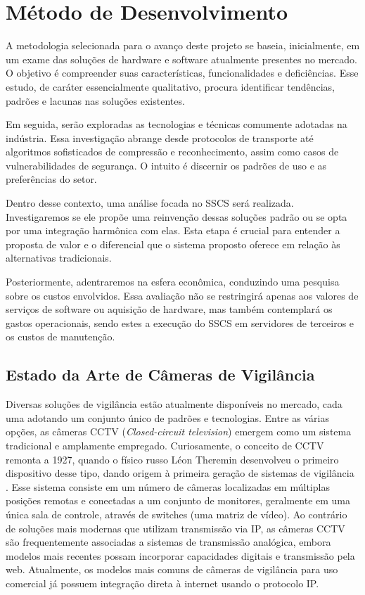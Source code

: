 \documentclass[12pt, %
openright, 
oneside, %
a4paper,    %
brazil]{facom-ufu-abntex2}
\begin{document}
\chapter{Método de Desenvolvimento}

A metodologia selecionada para o avanço deste projeto se baseia, inicialmente,
em um exame das soluções de hardware e software atualmente presentes no
mercado. O objetivo é compreender suas características, funcionalidades e
deficiências. Esse estudo, de caráter essencialmente qualitativo, procura
identificar tendências, padrões e lacunas nas soluções existentes.

Em seguida, serão exploradas as tecnologias e técnicas comumente adotadas na
indústria. Essa investigação abrange desde protocolos de transporte até
algoritmos sofisticados de compressão e reconhecimento, assim como casos de
vulnerabilidades de segurança. O intuito é discernir os padrões de uso e as
preferências do setor.

Dentro desse contexto, uma análise focada no SSCS será realizada.
Investigaremos se ele propõe uma reinvenção dessas soluções padrão ou se opta
por uma integração harmônica com elas. Esta etapa é crucial para entender a
proposta de valor e o diferencial que o sistema proposto oferece em relação às
alternativas tradicionais.

Posteriormente, adentraremos na esfera econômica, conduzindo uma pesquisa sobre
os custos envolvidos. Essa avaliação não se restringirá apenas aos valores de
serviços de software ou aquisição de hardware, mas também contemplará os gastos
operacionais, sendo estes a execução do SSCS em servidores de terceiros e os
custos de manutenção.

\section{Estado da Arte de Câmeras de Vigilância}

Diversas soluções de vigilância estão atualmente disponíveis no mercado, cada
uma adotando um conjunto único de padrões e tecnologias. Entre as várias
opções, as câmeras CCTV (\textit{\foreignlanguage{english}{Closed-circuit
		television}}) emergem como um sistema tradicional e amplamente empregado.
Curiosamente, o conceito de CCTV remonta a 1927, quando o físico russo Léon
Theremin desenvolveu o primeiro dispositivo desse tipo, dando origem à primeira
geração de sistemas de vigilância \cite{glinsky2000theremin}. Esse sistema
consiste em um número de câmeras localizadas em múltiplas posições remotas e
conectadas a um conjunto de monitores, geralmente em uma única sala de
controle, através de switches (uma matriz de vídeo). Ao contrário de soluções
mais modernas que utilizam transmissão via IP, as câmeras CCTV são
frequentemente associadas a sistemas de transmissão analógica, embora modelos
mais recentes possam incorporar capacidades digitais e transmissão pela web.
Atualmente, os modelos mais comuns de câmeras de vigilância para uso comercial
já possuem integração direta à internet usando o protocolo IP.
\end{document}
